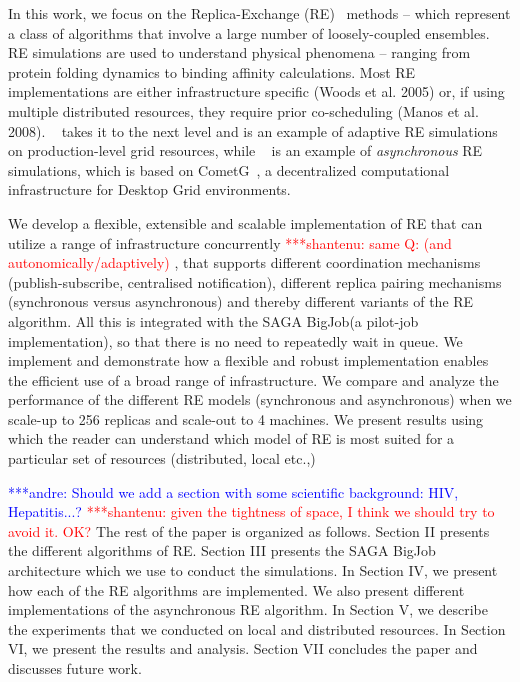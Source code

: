 \documentclass{rspublic}
\newcommand{\jhanote}[1]{ {\textcolor{red} { ***shantenu: #1 }}}
\newcommand{\alnote}[1]{ {\textcolor{blue} { ***andre: #1 }}}
\newcommand{\alnote}[1]{}
\newcommand{\jhanote}[1]{}
\begin{document}
In this work, we focus on the Replica-Exchange
(RE)~\citep{hansmann,Sugita:1999rm} methods -- which represent a class
of algorithms that involve a large number of loosely-coupled
ensembles.  RE simulations are used to understand physical phenomena
-- ranging from protein folding dynamics to binding affinity
calculations. Most RE implementations are either infrastructure
specific (Woods et al. 2005) or, if using multiple distributed
resources, they require prior co-scheduling (Manos et
al. 2008). ~\citep{Luckow:2008fp} takes it to the next level and is an
example of adaptive RE simulations on production-level grid resources,
while ~\citep{parashar_arepex} is an example of \emph{asynchronous} RE
simulations, which is based on
CometG~\citep{Li:2005:CSC:1090948.1091381}, a decentralized
computational infrastructure for Desktop Grid environments.

We develop a flexible, extensible and scalable implementation of RE
that can utilize a range of infrastructure concurrently \jhanote{same
  Q: (and autonomically/adaptively)}, that supports different
coordination mechanisms (publish-subscribe, centralised notification),
different replica pairing mechanisms (synchronous versus asynchronous)
and thereby different variants of the RE algorithm. All this is integrated with the SAGA BigJob(a pilot-job implementation), so that there is no need to repeatedly wait in queue. We implement and
demonstrate how a flexible and robust implementation enables the
efficient use of a broad range of infrastructure. We compare and
analyze the performance of the different RE models (synchronous and
asynchronous) when we scale-up to 256 replicas and scale-out to 4
machines.  We present results using which the reader can understand
which model of RE is most suited for a particular set of resources
(distributed, local etc.,)

\alnote{Should we add a section with some scientific background: HIV,
  Hepatitis...?}  \jhanote{given the tightness of space, I think we
  should try to avoid it. OK?} The rest of the paper is organized as
follows. Section II presents the different algorithms of RE. Section
III presents the SAGA BigJob architecture which we use to conduct the
simulations. In Section IV, we present how each of the RE algorithms
are implemented. We also present different implementations of the
asynchronous RE algorithm. In Section V, we describe the experiments
that we conducted on local and distributed resources. In Section VI,
we present the results and analysis. Section VII concludes the paper
and discusses future work.
\end{document}
